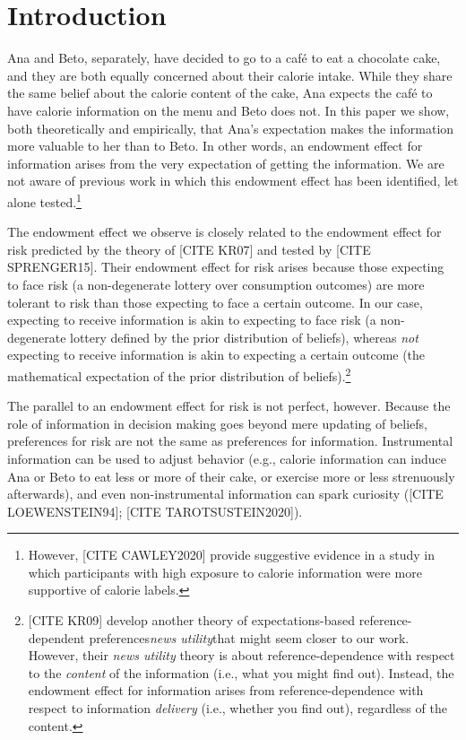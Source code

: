 \documentclass[12pt]{article}
\begin{document}
\clearpage


\section{Introduction}

Ana and Beto, separately, have decided to go to a café to eat a chocolate cake, and they are both equally concerned about their calorie intake. While they share the same belief about the calorie content of the cake, Ana expects the café to have calorie information on the menu and Beto does not. In this paper we show, both theoretically and empirically, that Ana’s expectation makes the information more valuable to her than to Beto.  In other words, an endowment effect for information arises from the very expectation of getting the information. We are not aware of previous work in which this endowment effect has been identified, let alone tested.\footnote{However, [CITE CAWLEY2020] provide suggestive evidence in a study in which participants with high exposure to calorie information were more supportive of calorie labels.}

The endowment effect we observe is closely related to the endowment effect for risk predicted by the theory of [CITE KR07] and tested by [CITE SPRENGER15]. Their endowment effect for risk arises because those expecting to face risk (a non-degenerate lottery over consumption outcomes) are more tolerant to risk than those expecting to face a certain outcome. In our case, expecting to receive information is akin to expecting to face risk (a non-degenerate lottery defined by the prior distribution of beliefs), whereas \emph{not} expecting to receive information is akin to expecting a certain outcome (the mathematical expectation of the prior distribution of beliefs).\footnote{[CITE KR09] develop another theory of expectations-based reference-dependent preferences\textemdash\emph{news utility}\textemdash that might seem closer to our work. However, their \emph{news utility} theory is about reference-dependence with respect to the \emph{content} of the information (i.e., what you might find out). Instead, the endowment effect for information arises from reference-dependence with respect to information \emph{delivery} (i.e., whether you find out), regardless of the content.}

The parallel to an endowment effect for risk is not perfect, however. Because the role of information in decision making goes beyond mere updating of beliefs, preferences for risk are not the same as preferences for information. Instrumental information can be used to adjust behavior (e.g., calorie information can induce Ana or Beto to eat less or more of their cake, or exercise more or less strenuously afterwards), and even non-instrumental information can spark curiosity ([CITE LOEWENSTEIN94]; [CITE TAROTSUSTEIN2020]).
\end{document}
